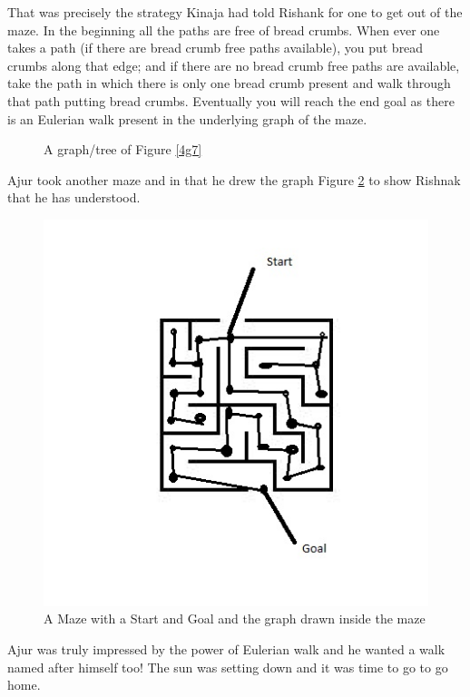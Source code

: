 That was precisely the strategy Kinaja had told Rishank for one to get out of the maze.  In the beginning all the paths are free of bread crumbs. When ever one takes a path (if there are bread crumb free paths available), you put bread crumbs along that edge; and if there are no bread crumb free paths are available, take the path in which there is only one bread crumb present and walk through that path putting bread crumbs. Eventually you will reach the end goal as there is an Eulerian walk present in the underlying graph of the maze.

\begin{figure}
\begin{center}
\caption{ A graph/tree of Figure \ref{4g7}}\label{4g8}
\end{center}
\end{figure}

Ajur took another maze and in that he drew the graph Figure \ref{4g9} to show Rishnak that he has understood.

\begin{figure}
\begin{center}
\includegraphics{anothermaze.jpg}
\caption{A Maze with a Start and Goal and the graph drawn inside the maze}\label{4g9}
\end{center}
\end{figure}
Ajur was truly impressed by the power of Eulerian walk and he wanted a walk named after himself too! The sun was setting down and it was time to go to go home.